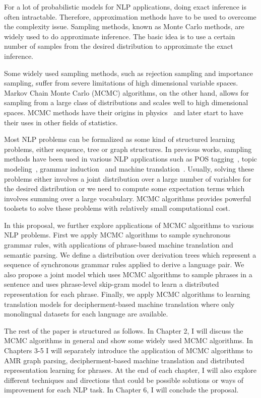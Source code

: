 For a lot of probabilistic models for NLP applications, doing exact inference is often intractable. Therefore, approximation methods have to be used to overcome the
complexity issue. Sampling methods, known as Monte Carlo methods, are widely used to do approximate inference. The basic idea is to use a certain number of
samples from the desired distribution to approximate the exact inference.


Some widely used sampling methods, such as rejection sampling and importance sampling, suffer from severe limitations of high dimensional variable spaces. Markov Chain Monte Carlo (MCMC)
algorithms, on the other hand, allows for sampling from a large class of distributions and scales well to high dimensional spaces. MCMC methods have their origins in physics~\cite{metropolis1949monte} and later start to have
their uses in other fields of statistics.


Most NLP problems can be formalized as some kind of structured learning problems, either sequence, tree or graph structures.
In previous works, sampling methods have been used in various NLP applications such as POS tagging~\cite{finkel2005incorporating}, topic modeling~\cite{wallach2006topic,steyvers2007probabilistic}, grammar induction~\cite{cohn-2009-inducing,PostGildea-acl09} and machine translation~\cite{denero2008sampling}. 
Usually, solving these problems either involves a joint distribution over a large number of variables for the desired distribution
or we need to compute some expectation terms which involves summing over a large vocabulary.
MCMC algorithms provides powerful toolsets to solve these problems with relatively small computational cost.


In this proposal, we further explore applications of MCMC algorithms to various NLP problems.
First we apply MCMC algorithms to sample synchronous grammar rules, with applications of phrase-based machine translation and semantic parsing. We define a distribution over derivation trees which represent a sequence of synchronous grammar rules applied to derive a language pair. We also propose a joint model which uses MCMC algorithms to sample phrases in a sentence and uses phrase-level
skip-gram model to learn a distributed representation for each phrase. Finally, we apply MCMC algorithms to learning translation models for decipherment-based machine translation where only monolingual datasets for each language are available.


The rest of the paper is structured as follows. In Chapter 2, I will discuss the MCMC algorithms in general and show some widely used MCMC algorithms. In Chapters 3-5 I will separately introduce the application of MCMC algorithms to 
AMR graph parsing, decipherment-based machine translation and distributed representation learning for phrases. At the end of each chapter, I will also explore different techniques and directions that
could be possible solutions or ways of improvement for each NLP task. In Chapter 6, I will conclude the proposal.
